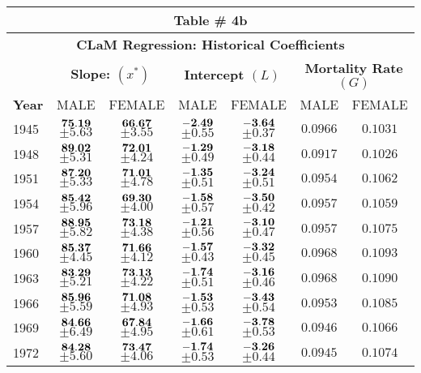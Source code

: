 \documentclass[10pt, titlepage]{article}%
\begin{document}
\begin{table}
  \begin{tabular}{||l|c|c|c|c|c|c||}
  \hline\hline
  \multicolumn{7}{||c||}{Table \# 4b } \\ \hline\hline
  \multicolumn{7}{||c||}{{\bf CLaM Regression: Historical Coefficients}} \\ \hline\hline
  
  { } & 
  \multicolumn{2}{|c|}{ \bf Slope: $(x^{*})$ } & 
  \multicolumn{2}{|c|}{ \bf Intercept $(L)$ }  &
  \multicolumn{2}{|c||}{ \bf Mortality Rate $(G)$ } \\ \hline\hline
  
  {\bf Year } &
  {MALE} & {FEMALE} &
  {MALE} & {FEMALE} &
  {MALE} & {FEMALE} \\ \hline\hline

  1945 &  $\bf 75.19$ $\pm 5.63$& $\bf 66.67$ $\pm 3.55$& $\bf -2.49$ $\pm 0.55$& $\bf -3.64$ $\pm 0.37$&  $0.0966$&  $0.1031$ \\ \hline\hline
  1948 &  $\bf 89.02$ $\pm 5.31$& $\bf 72.01$ $\pm 4.24$& $\bf -1.29$ $\pm 0.49$& $\bf -3.18$ $\pm 0.44$&  $0.0917$&  $0.1026$ \\ \hline\hline
  1951 &  $\bf 87.20$ $\pm 5.33$& $\bf 71.01$ $\pm 4.78$& $\bf -1.35$ $\pm 0.51$& $\bf -3.24$ $\pm 0.51$&  $0.0954$&  $0.1062$ \\ \hline\hline
  1954 &  $\bf 85.42$ $\pm 5.96$& $\bf 69.30$ $\pm 4.00$& $\bf -1.58$ $\pm 0.57$& $\bf -3.50$ $\pm 0.42$&  $0.0957$&  $0.1059$ \\ \hline\hline
  1957 &  $\bf 88.95$ $\pm 5.82$& $\bf 73.18$ $\pm 4.38$& $\bf -1.21$ $\pm 0.56$& $\bf -3.10$ $\pm 0.47$&  $0.0957$&  $0.1075$ \\ \hline\hline
  1960 &  $\bf 85.37$ $\pm 4.45$& $\bf 71.66$ $\pm 4.12$& $\bf -1.57$ $\pm 0.43$& $\bf -3.32$ $\pm 0.45$&  $0.0968$&  $0.1093$ \\ \hline\hline
  1963 &  $\bf 83.29$ $\pm 5.21$& $\bf 73.13$ $\pm 4.22$& $\bf -1.74$ $\pm 0.51$& $\bf -3.16$ $\pm 0.46$&  $0.0968$&  $0.1090$ \\ \hline\hline
  1966 &  $\bf 85.96$ $\pm 5.59$& $\bf 71.08$ $\pm 4.93$& $\bf -1.53$ $\pm 0.53$& $\bf -3.43$ $\pm 0.54$&  $0.0953$&  $0.1085$ \\ \hline\hline
  1969 &  $\bf 84.66$ $\pm 6.49$& $\bf 67.84$ $\pm 4.95$& $\bf -1.66$ $\pm 0.61$& $\bf -3.78$ $\pm 0.53$&  $0.0946$&  $0.1066$ \\ \hline\hline
  1972 &  $\bf 84.28$ $\pm 5.60$& $\bf 73.47$ $\pm 4.06$& $\bf -1.74$ $\pm 0.53$& $\bf -3.26$ $\pm 0.44$&  $0.0945$&  $0.1074$ \\ \hline\hline

\end{tabular}
\end{table}
\end{document}
